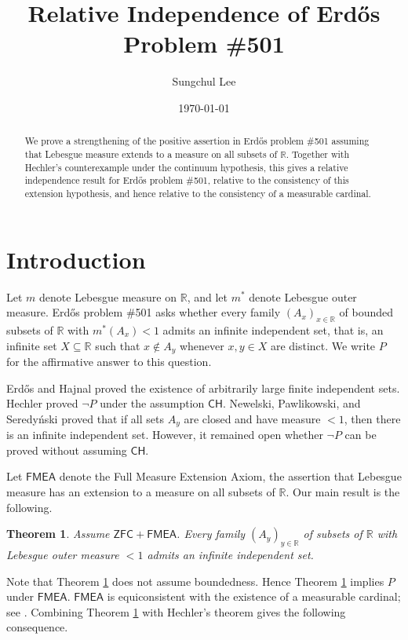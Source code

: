 \documentclass{amsart}
\title{Relative Independence of Erd\H{o}s Problem \#501}
\author{Sungchul Lee}
\date{\today}
\theoremstyle{plain}
\newtheorem{theorem}{Theorem}[section]
\theoremstyle{definition}
\newcommand{\R}{\mathbb{R}}
\newcommand{\ZFC}{\mathsf{ZFC}}
\newcommand{\FMEA}{\mathsf{FMEA}}
\newcommand{\CH}{\mathsf{CH}}
\begin{document}
\begin{abstract}
We prove a strengthening of the positive assertion in Erd\H{o}s problem \#501 assuming that Lebesgue measure extends to a measure on all subsets of $\R$.
Together with Hechler's counterexample under the continuum hypothesis, this gives a relative independence result for Erd\H{o}s problem \#501, relative to the consistency of this extension hypothesis, and hence relative to the consistency of a measurable cardinal.
\end{abstract}

\maketitle

\section{Introduction}

Let $m$ denote Lebesgue measure on $\R$, and let $m^*$ denote Lebesgue outer measure.
Erd\H{o}s problem \#501 \cite{ErdosProblems501} asks whether every family $(A_x)_{x\in\R}$ of bounded subsets of $\R$ with $m^*(A_x)<1$ admits an infinite independent set, that is, an infinite set $X\subseteq\R$ such that $x\notin A_y$ whenever $x,y\in X$ are distinct.
We write $P$ for the affirmative answer to this question.

Erd\H{o}s and Hajnal \cite{ErdosHajnal1960} proved the existence of arbitrarily large finite independent sets.
Hechler \cite{Hechler1972} proved $\neg P$ under the assumption $\CH$.
Newelski, Pawlikowski, and Seredy\'nski \cite{NPS1987} proved that if all sets $A_y$ are closed and have measure $<1$, then there is an infinite independent set.
However, it remained open whether $\neg P$ can be proved without assuming $\CH$.

Let $\FMEA$ denote the Full Measure Extension Axiom, the assertion that Lebesgue measure has an extension to a measure on all subsets of $\R$.
Our main result is the following.

\begin{theorem}\label{thm:main}
Assume $\ZFC+\FMEA$.
Every family $(A_y)_{y\in\R}$ of subsets of $\R$ with Lebesgue outer measure $<1$ admits an infinite independent set.
\end{theorem}

Note that Theorem \ref{thm:main} does not assume boundedness.
Hence Theorem \ref{thm:main} implies $P$ under $\FMEA$.
$\FMEA$ is equiconsistent with the existence of a measurable cardinal; see \cite[1D(e), 2E]{FremlinRVM}.
Combining Theorem \ref{thm:main} with Hechler's theorem gives the following consequence.
\end{document}
